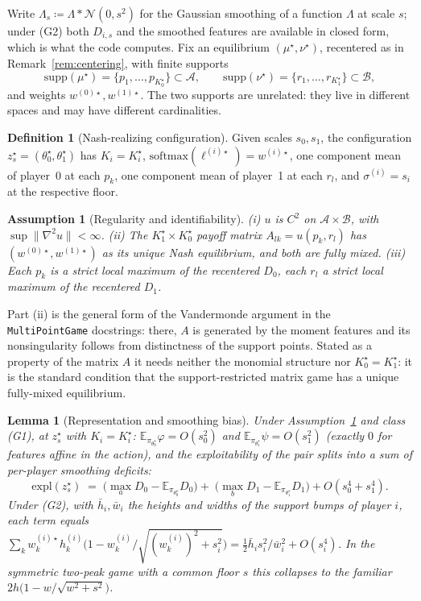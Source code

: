 \documentclass[11pt]{article}
\newtheorem{lemma}{Lemma}
\newtheorem{assumption}{Assumption}
\theoremstyle{definition}
\newtheorem{definition}{Definition}
\newcommand{\E}{\mathbb{E}}
\newcommand{\cA}{\mathcal{A}}
\newcommand{\cB}{\mathcal{B}}
\begin{document}
Write $\Lambda_s \coloneqq \Lambda * \mathcal{N}(0, s^2)$ for the Gaussian
smoothing of a function $\Lambda$ at scale $s$; under (G2) both $D_{i,s}$ and
the smoothed features are available in closed form, which is what the code
computes. Fix an equilibrium $(\mu^\star, \nu^\star)$, recentered as in
Remark~\ref{rem:centering}, with finite supports
\[
  \mathrm{supp}(\mu^\star) = \{p_1, \dots, p_{K_0^\star}\} \subset \cA,
  \qquad
  \mathrm{supp}(\nu^\star) = \{r_1, \dots, r_{K_1^\star}\} \subset \cB,
\]
and weights $w^{(0)\star}, w^{(1)\star}$. The two supports are unrelated: they
live in different spaces and may have different cardinalities.

\begin{definition}[Nash-realizing configuration]
Given scales $s_0, s_1$, the configuration $z^\star_s = (\theta^\star_0,
\theta^\star_1)$ has $K_i = K_i^\star$, $\mathrm{softmax}(\ell^{(i)\star}) =
w^{(i)\star}$, one component mean of player~0 at each $p_k$, one component mean
of player~1 at each $r_l$, and $\sigma^{(i)} = s_i$ at the respective floor.
\end{definition}

\begin{assumption}[Regularity and identifiability]\label{ass:reg}
(i) $u$ is $C^2$ on $\cA \times \cB$, with $\sup \|\nabla^2 u\| < \infty$.
(ii) The $K_1^\star \times K_0^\star$ payoff matrix $A_{lk} = u(p_k, r_l)$ has
$(w^{(0)\star}, w^{(1)\star})$ as its \emph{unique} Nash equilibrium, and both
are fully mixed. (iii) Each $p_k$ is a strict local maximum of the recentered
$D_0$, each $r_l$ a strict local maximum of the recentered $D_1$.
\end{assumption}

Part (ii) is the general form of the Vandermonde argument in the
\texttt{MultiPointGame} docstrings: there, $A$ is generated by the moment
features and its nonsingularity follows from distinctness of the support
points. Stated as a property of the matrix $A$ it needs neither the monomial
structure nor $K_0^\star = K_1^\star$: it is the standard condition that the
support-restricted matrix game has a unique fully-mixed equilibrium.

\begin{lemma}[Representation and smoothing bias]\label{lem:bias}
Under Assumption~\ref{ass:reg} and class (G1), at $z^\star_s$ with
$K_i = K_i^\star$:
$\E_{\pi_{\theta_0^\star}} \varphi = O(s_0^2)$ and
$\E_{\pi_{\theta_1^\star}} \psi = O(s_1^2)$ (exactly $0$ for features affine in
the action), and the exploitability of the pair splits into a sum of
\emph{per-player} smoothing deficits:
\[
  \mathrm{expl}(z^\star_s)
  \;=\; \Big(\max_a D_0 - \E_{\pi_{\theta_0^\star}} D_0\Big)
     +\; \Big(\max_b D_1 - \E_{\pi_{\theta_1^\star}} D_1\Big)
     + O(s_0^4 + s_1^4) .
\]
Under (G2), with $\bar h_i, \bar w_i$ the heights and widths of the support
bumps of player $i$, each term equals
$\sum_k w^{(i)\star}_k h^{(i)}_k \big(1 - w^{(i)}_k /
\sqrt{(w^{(i)}_k)^2 + s_i^2}\big)
= \tfrac12 \bar h_i s_i^2 / \bar w_i^2 + O(s_i^4)$. In the symmetric two-peak
game with a common floor $s$ this collapses to the familiar
$2h\big(1 - w/\sqrt{w^2+s^2}\big)$.
\end{lemma}
\end{document}
